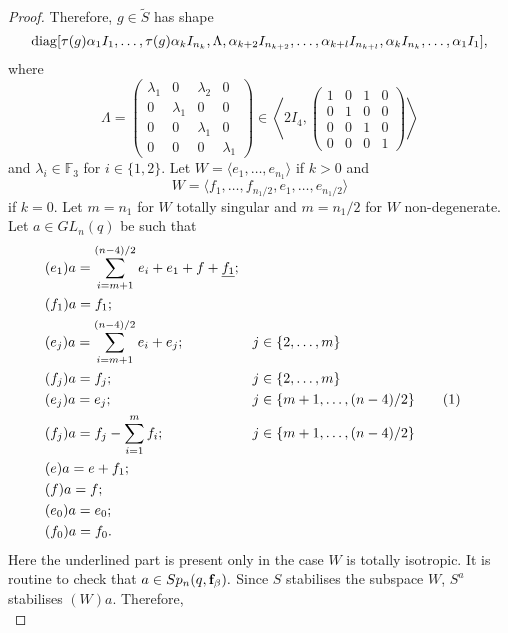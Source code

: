 \begin{proof}
 Therefore, $g \in \tilde{S}$ has shape 
$$\mathrm{diag}[\tau(g)\alpha_1 I_1, \ldots, \tau(g)\alpha_k I_{n_{k}}, \Lambda, \alpha_{k+2} I_{n_{k+2}}, \ldots, \alpha_{k+l} I_{n_{k+l}}, \alpha_k I_{n_k}, \ldots, \alpha_1 I_{1} ],$$
where $$
\Lambda = 
\left( \begin{smallmatrix}
\lambda_1&0&\lambda_2&0\\
0&\lambda_1&0&0\\
0&0&\lambda_1&0\\
0&0&0&\lambda_1
\end{smallmatrix} \right) \in
 \left\langle 2I_4, \left( \begin{smallmatrix}
1&0&1&0\\
0&1&0&0\\
0&0&1&0\\
0&0&0&1
\end{smallmatrix} \right)
 \right\rangle$$ and $\lambda_i \in \mathbb{F}_3$ for $i \in \{1,2\}.$
Let $W= \langle e_1, \ldots, e_{n_1} \rangle$ if $k>0$ and $$W= \langle f_1, \ldots, f_{n_{1}/2},e_1, \ldots, e_{n_1/2} \rangle$$ if $k=0.$ Let $m=n_1$ for $W$ totally singular and $m=n_1/2$ for $W$ non-degenerate. Let $a \in GL_n(q)$ be such that 
\begingroup
\allowdisplaybreaks
\begin{align*}
&(e_1)a =\sum_{i=m+1}^{(n-4)/2} e_i +e_1 + f +\underline{f_1}; \\ & (f_1)a=f_1; \\
&(e_{j})a =\sum_{i=m+1}^{(n-4)/2} e_i +e_j; && j\in \{2, \ldots, m \} \\ &(f_{j})a=f_{j};  && j\in \{2, \ldots, m \}   \\
&(e_{j})a =e_j;  && j\in \{m+1, \ldots, (n-4)/2 \} \stepcounter{equation}\tag{\theequation}  \label{aSp4qq3} \\ &(f_{j})a=f_{j} -\sum_{i=1}^{m} f_i;  && j\in \{m+1, \ldots, (n-4)/2 \}   \\
& (e)a=e+f_1; \\ & (f)a=f; \\
& (e_0)a=e_0; \\ & (f_0)a=f_0.
\end{align*}
\endgroup
Here the underlined part is present only in the case $W$ is totally isotropic. It is routine to check that $a \in Sp_n(q, {\bf f}_{\beta}).$   Since $S$ stabilises the subspace $W$,  $S^a$ stabilises $(W)a.$ %
 Therefore, 
\begin{equation}\label{Wisotrq3n14}

\end{equation}
\end{proof}
